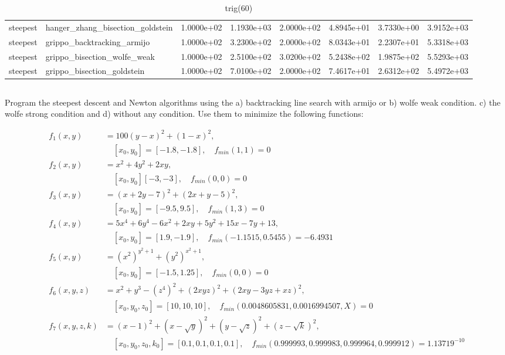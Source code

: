 \documentclass[a4paper,11pt]{article}
\numberwithin{equation}{section} %
\begin{document}
\begin{table}[h!]
{\begin{tabular}{|l|l|l|l|l|l|l|l|}
        steepest & hanger\_zhang\_bisection\_goldstein & 1.0000e+02 & 1.1930e+03 & 2.0000e+02 & 4.8945e+01 & 3.7330e+00 & 3.9152e+03 \\
        steepest & grippo\_backtracking\_armijo & 1.0000e+02 & 3.2300e+02 & 2.0000e+02 & 8.0343e+01 & 2.2307e+01 & 5.3318e+03 \\
        steepest & grippo\_bisection\_wolfe\_weak & 1.0000e+02 & 2.5100e+02 & 3.0200e+02 & 5.2438e+02 & 1.9875e+02 & 5.5293e+03 \\
        steepest & grippo\_bisection\_goldstein & 1.0000e+02 & 7.0100e+02 & 2.0000e+02 & 7.4617e+01 & 2.6312e+02 & 5.4972e+03 \\
\end{tabular}}
\caption{trig(60)}
\label{table:trig(60)}
\end{table}

\clearpage

\subsection{}

Program the steepest descent and Newton algorithms using the a) backtracking line search with armijo or b) wolfe weak condition. c) the wolfe strong condition and d) without any condition. Use them to minimize the following functions:

\begin{align*}
    f_1(x,y) &= 100 (y-x)^2 + (1-x)^2, \\ &\quad [x_0,y_0] = [-1.8,-1.8], \quad f_{min}(1,1)=0  \\
    f_2(x,y) &= x^2 + 4y^2 + 2xy, \\ & \quad [x_0,y_0] [-3,-3], \quad f_{min}(0,0) = 0 \\
    f_3(x,y) &= (x+2y-7)^2 + (2x+y-5)^2, \\ & \quad [x_0,y_0] = [-9.5,9.5], \quad f_{min}(1,3) = 0 \\
    f_4(x,y) &= 5x^4 + 6y^4 - 6x^2 + 2xy + 5y^2 + 15x -7y + 13, \\ & \quad [x_0,y_0] = [1.9,-1.9], \quad f_{min}(-1.1515,0.5455) = -6.4931 \\ 
    f_5(x,y) &= (x^2)^{y^2+1} + (y^2)^{x^2+1},\\ & \quad [x_0,y_0] = [-1.5,1.25], \quad f_{min}(0,0) = 0 \\
    f_6(x,y,z) &= x^2 + y^3 - (z^4)^2 + (2xyz)^2 + (2xy-3yz+xz)^2, \\ & \quad [x_0,y_0,z_0] = [10,10,10], \quad f_{min}(0.0048605831,0.0016994507,X) = 0 \\
    f_7(x,y,z,k) &= (x-1)^2 + (x-\sqrt{y})^2 + (y-\sqrt{z})^2 + (z-\sqrt{k})^2, \\ & \quad [x_0,y_0,z_0,k_0] = [0.1,0.1,0.1,0.1], \quad f_{min}(0.999993,0.999983,0.999964,0.999912) = 1.13719^{-10} \\
\end{align*}
\end{document}
